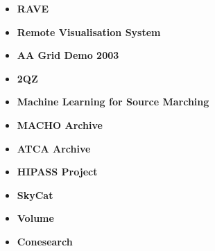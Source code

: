 \begin{itemize}
\item \textbf{RAVE}

\item \textbf{Remote Visualisation System}

\item \textbf{AA Grid Demo 2003}

\item \textbf{2QZ}

\item \textbf{Machine Learning for Source Marching}

\item \textbf{MACHO Archive}

\item \textbf{ATCA Archive}

\item \textbf{HIPASS Project}

\item \textbf{SkyCat}

\item \textbf{Volume}

\item \textbf{Conesearch}
\end{itemize}
